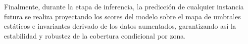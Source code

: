 Finalmente, durante la etapa de inferencia, la predicción de cualquier instancia futura se realiza proyectando los scores del modelo sobre el mapa de umbrales estáticos e invariantes derivado de los datos aumentados, garantizando así la estabilidad y robustez de la cobertura condicional por zona.














